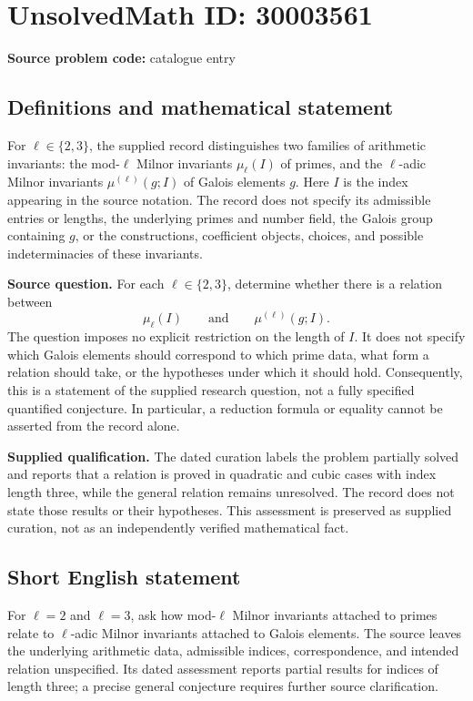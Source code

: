 \documentclass[11pt]{article}
\begin{document}
\section*{UnsolvedMath ID: 30003561}
\textbf{Source problem code:} catalogue entry
\subsection{Definitions and mathematical statement}
For \(\ell\in\{2,3\}\), the supplied record distinguishes two families of arithmetic invariants: the mod-\(\ell\) Milnor invariants \(\mu_\ell(I)\) of primes, and the \(\ell\)-adic Milnor invariants \(\mu^{(\ell)}(g;I)\) of Galois elements \(g\). Here \(I\) is the index appearing in the source notation. The record does not specify its admissible entries or lengths, the underlying primes and number field, the Galois group containing \(g\), or the constructions, coefficient objects, choices, and possible indeterminacies of these invariants.

\textbf{Source question.} For each \(\ell\in\{2,3\}\), determine whether there is a relation between
\[
\mu_\ell(I)\qquad\text{and}\qquad\mu^{(\ell)}(g;I).
\]
The question imposes no explicit restriction on the length of \(I\). It does not specify which Galois elements should correspond to which prime data, what form a relation should take, or the hypotheses under which it should hold. Consequently, this is a statement of the supplied research question, not a fully specified quantified conjecture. In particular, a reduction formula or equality cannot be asserted from the record alone.

\textbf{Supplied qualification.} The dated curation labels the problem partially solved and reports that a relation is proved in quadratic and cubic cases with index length three, while the general relation remains unresolved. The record does not state those results or their hypotheses. This assessment is preserved as supplied curation, not as an independently verified mathematical fact.
\subsection{Short English statement}
For \(\ell=2\) and \(\ell=3\), ask how mod-\(\ell\) Milnor invariants attached to primes relate to \(\ell\)-adic Milnor invariants attached to Galois elements. The source leaves the underlying arithmetic data, admissible indices, correspondence, and intended relation unspecified. Its dated assessment reports partial results for indices of length three; a precise general conjecture requires further source clarification.
\end{document}
